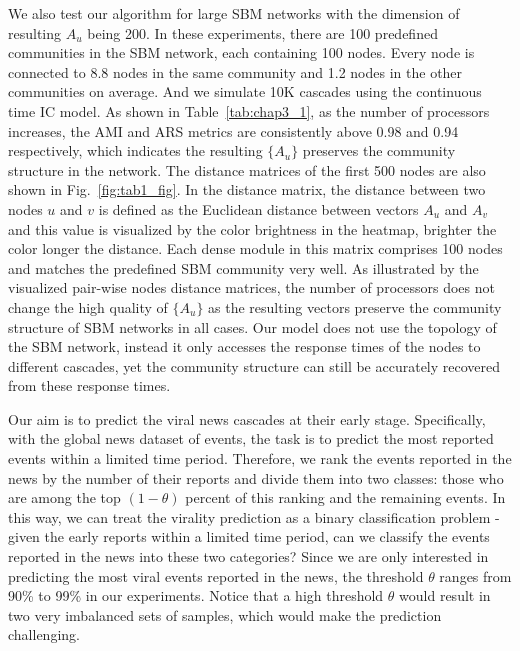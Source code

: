 We also test our algorithm for large SBM networks with the dimension of resulting $A_u$ being 200. In these experiments, there are 100 predefined communities in the SBM network, each containing 100 nodes. Every node is connected to 8.8 nodes in the same community and 1.2 nodes in the other communities on average. And we simulate 10K cascades using the continuous time IC model. As shown in Table~\ref{tab:chap3_1}, as the number of processors increases, the AMI and ARS metrics are consistently above 0.98 and 0.94 respectively, which indicates the resulting $\{A_u\}$ preserves the community structure in the network. The distance matrices of the first 500 nodes are also shown in Fig.~\ref{fig:tab1_fig}. In the distance matrix, the distance between two nodes $u$ and $v$ is defined as the Euclidean distance between vectors $A_u$ and $A_v$ and this value is visualized by the color brightness in the heatmap, brighter the color longer the distance. Each dense module in this matrix comprises 100 nodes and matches the predefined SBM community very well. As illustrated by the visualized pair-wise nodes distance matrices, the number of processors does not change the high quality of $\{A_u\}$ as the resulting vectors preserve the community structure of SBM networks in all cases. Our model does not use the topology of the SBM network, instead it only accesses the response times of the nodes to different cascades, yet the community structure can still be accurately recovered from these response times.

Our aim is to predict the viral news cascades at their early stage. Specifically, with the global news dataset of events, the task is to predict the most reported events within a limited time period. Therefore, we rank the events reported in the news by the number of their reports and divide them into two classes: those who are among the top $(1-\theta)$ percent of this ranking and the remaining events. In this way, we can treat the virality prediction as a binary classification problem - given the early reports within a limited time period, can we classify the events reported in the news into these two categories? Since we are only interested in predicting the most viral events reported in the news, the threshold $\theta$ ranges from 90\% to 99\% in our experiments. Notice that a high threshold $\theta$ would result in two very imbalanced sets of samples, which would make the prediction challenging.

